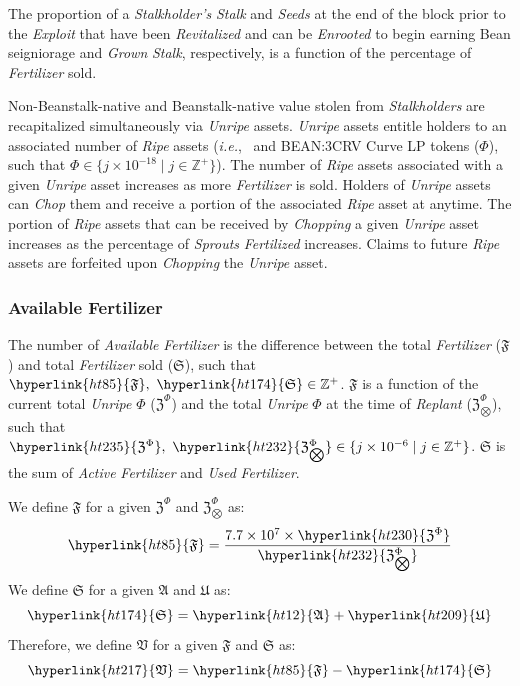 \documentclass[tikz]{article}
\newcommand{\term}[1]{\textsl{#1}}
\newcommand{\Bean}{} %
\begin{document}
The proportion of a \term{Stalkholder's} \term{Stalk} and \term{Seeds} at the end of the block prior to the \term{Exploit} that have been \term{Revitalized} and can be \term{Enrooted} to begin earning Bean seigniorage and \term{Grown} \term{Stalk}, respectively, is a function of the percentage of \term{Fertilizer} sold.

Non-Beanstalk-native and Beanstalk-native value stolen from \term{Stalkholders} are recapitalized simultaneously via \term{Unripe} assets. \term{Unripe} assets entitle holders to an associated number of \term{Ripe} assets (\term{i.e.}, \Bean\ and BEAN:3CRV Curve LP tokens ($\Phi$), such that $\Phi \in \{j \times 10^{-18} \mid j \in \mathbb{Z}^{+} \}$). The number of \term{Ripe} assets associated with a given \term{Unripe} asset increases as more \term{Fertilizer} is sold. Holders of \term{Unripe} assets can \term{Chop} them and receive a portion of the associated \term{Ripe} asset at anytime. The portion of \term{Ripe} assets that can be received by \term{Chopping} a given \term{Unripe} asset increases as the percentage of \term{Sprouts} \term{Fertilized} increases. Claims to future \term{Ripe} assets are forfeited upon \term{Chopping} the \term{Unripe} asset. 

\subsubsection{Available Fertilizer}
The number of \term{Available} \term{Fertilizer} is the difference between the total \term{Fertilizer} (\hyperlink{ht85}{$\mathfrak{F}$}) and total \term{Fertilizer} sold (\hyperlink{ht174}{$\mathfrak{S}$}), such that $\hyperlink{ht85}{\mathfrak{F}},\ \hyperlink{ht174}{\mathfrak{S}} \in \mathbb{Z}^{+}$. \hyperlink{ht85}{$\mathfrak{F}$} is a function of the current total \term{Unripe} \hyperlink{ht187}{$\Phi$} (\hyperlink{ht230}{$\mathfrak{Z}^{\Phi}$}) and the total \term{Unripe} \hyperlink{ht187}{$\Phi$} at the time of \term{Replant} (\hyperlink{ht232}{$\mathfrak{Z}_{\bigotimes}^{\Phi}$}), such that $\hyperlink{ht235}{\mathfrak{Z}^{\Phi}},\ \hyperlink{ht232}{\mathfrak{Z}_{\bigotimes}^{\Phi}} \in \{j \times 10^{-6} \mid j \in \mathbb{Z}^{+} \}$. \hyperlink{ht174}{$\mathfrak{S}$} is the sum of \term{Active} \term{Fertilizer} and \term{Used} \term{Fertilizer}.

We define \hyperlink{ht85}{$\mathfrak{F}$} for a given \hyperlink{ht230}{$\mathfrak{Z}^{\Phi}$} and \hyperlink{ht232}{$\mathfrak{Z}_{\bigotimes}^{\Phi}$} as:
$$\hyperlink{ht85}{\mathfrak{F}} = \frac{7.7 \times 10^{7} \times \hyperlink{ht230}{\mathfrak{Z}^{\Phi}}}{\hyperlink{ht232}{\mathfrak{Z}_{\bigotimes}^{\Phi}}}$$
We define \hyperlink{ht174}{$\mathfrak{S}$} for a given \hyperlink{ht12}{$\mathfrak{A}$} and \hyperlink{ht209}{$\mathfrak{U}$} as: 
$$\hyperlink{ht174}{\mathfrak{S}} = \hyperlink{ht12}{\mathfrak{A}} + \hyperlink{ht209}{\mathfrak{U}}$$
Therefore, we define \hyperlink{ht217}{$\mathfrak{V}$} for a given \hyperlink{ht85}{$\mathfrak{F}$} and \hyperlink{ht174}{$\mathfrak{S}$} as:
$$\hyperlink{ht217}{\mathfrak{V}} = \hyperlink{ht85}{\mathfrak{F}} - \hyperlink{ht174}{\mathfrak{S}}$$
\end{document}
